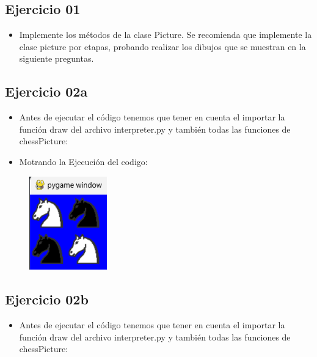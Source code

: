 \documentclass{article}
\begin{document}
	\subsection{Ejercicio 01}
	\begin{itemize}	
		\item Implemente los métodos de la clase Picture. Se recomienda que implemente la clase picture por etapas, probando realizar los dibujos que se muestran en la siguiente preguntas.
	\end{itemize}	

		

	\subsection{Ejercicio 02a}
	\begin{itemize}	
		\item Antes de ejecutar el código tenemos que tener en cuenta el importar la función draw del archivo interpreter.py y también todas las funciones de chessPicture:
	\end{itemize}	

		

	\begin{itemize}	
		\item Motrando la Ejecución del codigo:
	\end{itemize}	

	\begin{figure}[H]
		\centering
		\includegraphics[width=0.3\textwidth,keepaspectratio]{img/Ejercicio2a.png}
	\end{figure}


	\subsection{Ejercicio 02b}
	\begin{itemize}	
		\item Antes de ejecutar el código tenemos que tener en cuenta el importar la función draw del archivo interpreter.py y también todas las funciones de chessPicture:
	\end{itemize}	
\end{document}
